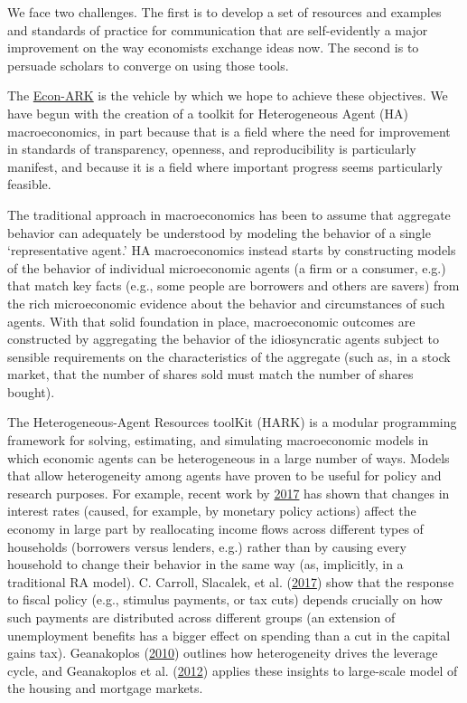 \message{ !name(ccarroll_et_al_scipy_2018.tex)}\documentclass[10pt,twocolumn]{article}
\providecommand{\EconARK}{\href{http://econ-ark.org}{Econ-ARK}}
\begin{document}
We face two challenges.  The first is to develop a set of resources and examples and standards of practice for communication that are self-evidently a major improvement on the way economists exchange ideas now.  The second is to persuade scholars to converge on using those tools.

The {\EconARK} is the vehicle by which we hope to achieve these objectives.  We have begun with the creation of a toolkit for Heterogeneous Agent (HA) macroeconomics, in part because that is a field where the need for improvement in standards of transparency, openness, and reproducibility is particularly manifest, and because it is a field where important progress seems particularly feasible.

The traditional approach in macroeconomics has been to assume that aggregate behavior can adequately be understood by modeling the behavior of a single `representative agent.'  HA macroeconomics instead starts by constructing models of the behavior of individual microeconomic agents (a firm or a consumer, e.g.) that match key facts (e.g., some people are borrowers and others are savers) from the rich microeconomic evidence about the behavior and circumstances of such agents. With that solid foundation in place, macroeconomic outcomes are constructed by aggregating the behavior of the idiosyncratic agents subject to sensible requirements on the characteristics of the aggregate (such as, in a stock market, that the number of shares sold must match the number of shares bought).

The Heterogeneous-Agent Resources toolKit (HARK) is a modular programming framework for solving, estimating, and simulating macroeconomic models in which economic agents can be heterogeneous in a large number of ways.  Models that allow heterogeneity among agents have proven to be useful for policy and research purposes. For example, recent work by \protect\hyperlink{kmvHANK}{2017} has shown that changes in interest rates (caused, for example, by monetary policy actions) affect the economy in large part by reallocating income flows across different types of households (borrowers versus lenders, e.g.) rather than by causing every household to change their behavior in the same way (as, implicitly, in a traditional RA model).  C. Carroll, Slacalek, et al.  (\protect\hyperlink{ref-carroll2017distribution}{2017}) show that the response to fiscal policy (e.g., stimulus payments, or tax cuts) depends crucially on how such payments are distributed across different groups (an extension of unemployment benefits has a bigger effect on spending than a cut in the capital gains tax). Geanakoplos (\protect\hyperlink{ref-geanakoplos2010leverage}{2010}) outlines how heterogeneity drives the leverage cycle, and Geanakoplos et al.  (\protect\hyperlink{ref-geanakoplos2012getting}{2012}) applies these insights to large-scale model of the housing and mortgage markets.
\end{document}
